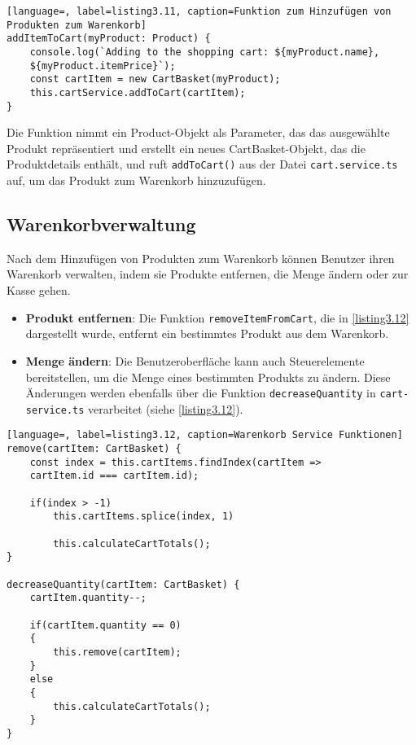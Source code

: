 \begin{lstlisting}[language=, label=listing3.11, caption=Funktion zum Hinzufügen von Produkten zum Warenkorb]
addItemToCart(myProduct: Product) {
	console.log(`Adding to the shopping cart: ${myProduct.name}, 
	${myProduct.itemPrice}`);
	const cartItem = new CartBasket(myProduct);
	this.cartService.addToCart(cartItem);
}
\end{lstlisting}

Die Funktion nimmt ein Product-Objekt als Parameter, das das ausgewählte Produkt repräsentiert und erstellt ein neues CartBasket-Objekt, das die Produktdetails enthält, und ruft \verb*|addToCart()| aus der Datei \verb*|cart.service.ts| auf, um das Produkt zum Warenkorb hinzuzufügen.

\subsection{Warenkorbverwaltung}

Nach dem Hinzufügen von Produkten zum Warenkorb können Benutzer ihren Warenkorb verwalten, indem sie Produkte entfernen, die Menge ändern oder zur Kasse gehen.

\begin{itemize}
	\item \textbf{Produkt entfernen}: Die Funktion \verb*|removeItemFromCart|, die in \ref{listing3.12} dargestellt wurde, entfernt ein bestimmtes Produkt aus dem Warenkorb.
	\item \textbf{Menge ändern}: Die Benutzeroberfläche kann auch Steuerelemente bereitstellen, um die Menge eines bestimmten Produkts zu ändern. Diese Änderungen werden ebenfalls über die Funktion \verb*|decreaseQuantity| in \verb*|cart-service.ts| verarbeitet (siehe \ref{listing3.12}).
\end{itemize}

\begin{lstlisting}[language=, label=listing3.12, caption=Warenkorb Service Funktionen]
remove(cartItem: CartBasket) {
	const index = this.cartItems.findIndex(cartItem => 
	cartItem.id === cartItem.id);
	
	if(index > -1)
		this.cartItems.splice(index, 1)
	
		this.calculateCartTotals();
}

decreaseQuantity(cartItem: CartBasket) {
	cartItem.quantity--;
	
	if(cartItem.quantity == 0)
	{
		this.remove(cartItem);
	}
	else
	{
		this.calculateCartTotals();
	}
}
\end{lstlisting}

